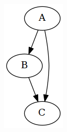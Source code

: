 \begin{figure}[htbp]
	\centering
	\begin{subfigure}[ht]{0.23\textwidth}
		\centering
		\begin{subfigure}[ht]{0.45\textwidth}
			
		\end{subfigure}
		\begin{subfigure}[ht]{0.42\textwidth}
			\includegraphics[width=\textwidth]{inc/primitives/if.png}

\end{subfigure}
\end{subfigure}
\end{figure}
